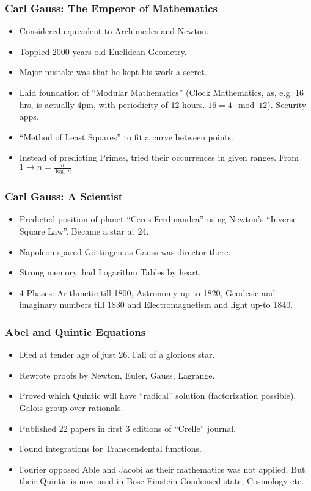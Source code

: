 \begin{frame}[fragile]
\frametitle{Carl Gauss: The Emperor of Mathematics}
\begin{itemize}[label=\textbullet,noitemsep,nolistsep]
\item Considered equivalent to Archimedes and Newton.
\item Toppled 2000 years old Euclidean Geometry.
\item Major mistake was that he kept his work a secret.
\item Laid foundation of ``Modular Mathematics'' (Clock Mathematics, as, e.g. 16 hrs, is actually 4pm, with periodicity of 12 hours. $ 16 = 4 \mod 12$). Security apps.
\item ``Method of Least Squares'' to fit a curve between points.
\item Instead of predicting Primes, tried their occurrences in given ranges. From $1 \rightarrow n = \frac{n}{\log_e{n}}$
\end{itemize}
\end{frame}

\begin{frame}[fragile]
\frametitle{Carl Gauss: A Scientist}
\begin{itemize}[label=\textbullet,noitemsep,nolistsep]
\item Predicted position of planet ``Ceres Ferdinandea'' using Newton's ``Inverse Square Law''.  Became a star at 24.
\item Napoleon spared G\"ottingen as Gauss was director there.
\item Strong memory, had Logarithm Tables by heart.
\item 4 Phases: Arithmetic till 1800, Astronomy up-to 1820, Geodesic and imaginary numbers till 1830 and Electromagnetism and light up-to 1840.
\end{itemize}
\end{frame}

\begin{frame}[fragile]
\frametitle{Abel and Quintic Equations}
\begin{itemize}[label=\textbullet,noitemsep,nolistsep]
\item Died at tender age of just 26. Fall of a glorious star.
\item Rewrote proofs by Newton, Euler, Gauss, Lagrange.
\item Proved which Quintic will have ``radical'' solution (factorization possible). Galois group over rationals.
\item Published 22 papers in first 3 editions of ``Crelle'' journal.
\item Found integrations for Transcendental functions.
\item Fourier opposed Able and Jacobi as their mathematics was not applied. But their Quintic is now used in Bose-Einstein Condensed state, Cosmology etc.
\end{itemize}
\end{frame}

